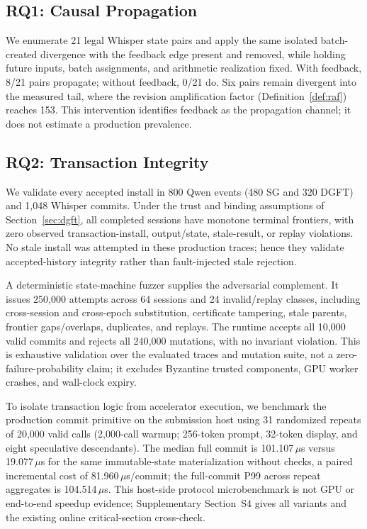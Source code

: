 \subsection{RQ1: Causal Propagation}\label{sec:eval:rq1}

We enumerate 21 legal Whisper state pairs and apply the same isolated
batch-created divergence with the feedback edge present and removed, while
holding future inputs, batch assignments, and arithmetic realization fixed.
With feedback, 8/21 pairs propagate; without feedback, 0/21 do. Six pairs
remain divergent into the measured tail, where the revision amplification
factor (Definition~\ref{def:raf}) reaches 153. This intervention identifies
feedback as the propagation channel; it does not estimate a production
prevalence.

\subsection{RQ2: Transaction Integrity}\label{sec:eval:rq2}

We validate every accepted install in 800 Qwen events (480 SG and 320 DGFT)
and 1{,}048 Whisper commits. Under the trust and binding assumptions of
Section~\ref{sec:dgft}, all completed sessions have monotone terminal frontiers,
with zero observed transaction-install, output/state, stale-result, or replay
violations. No stale install was attempted in these production traces; hence
they validate accepted-history integrity rather than fault-injected stale
rejection.

A deterministic state-machine fuzzer supplies the adversarial complement. It
issues 250{,}000 attempts across 64 sessions and 24 invalid/replay classes,
including cross-session and cross-epoch substitution, certificate tampering,
stale parents, frontier gaps/overlaps, duplicates, and replays. The runtime
accepts all 10{,}000 valid commits and rejects all 240{,}000 mutations, with no
invariant violation. This is exhaustive validation over the evaluated traces
and mutation suite, not a zero-failure-probability claim; it excludes Byzantine
trusted components, GPU worker crashes, and wall-clock expiry.

To isolate transaction logic from accelerator execution, we benchmark the
production commit primitive on the submission host using 31 randomized
repeats of 20{,}000 valid calls (2{,}000-call warmup; 256-token prompt,
32-token display, and eight speculative descendants). The median full commit
is 101.107\,$\mu$s versus 19.077\,$\mu$s for the same immutable-state
materialization without checks, a paired incremental cost of
81.960\,$\mu$s/commit; the full-commit P99 across repeat aggregates is
104.514\,$\mu$s. This host-side protocol microbenchmark is not GPU or
end-to-end speedup evidence; Supplementary Section~S4 gives all variants and
the existing online critical-section cross-check.

